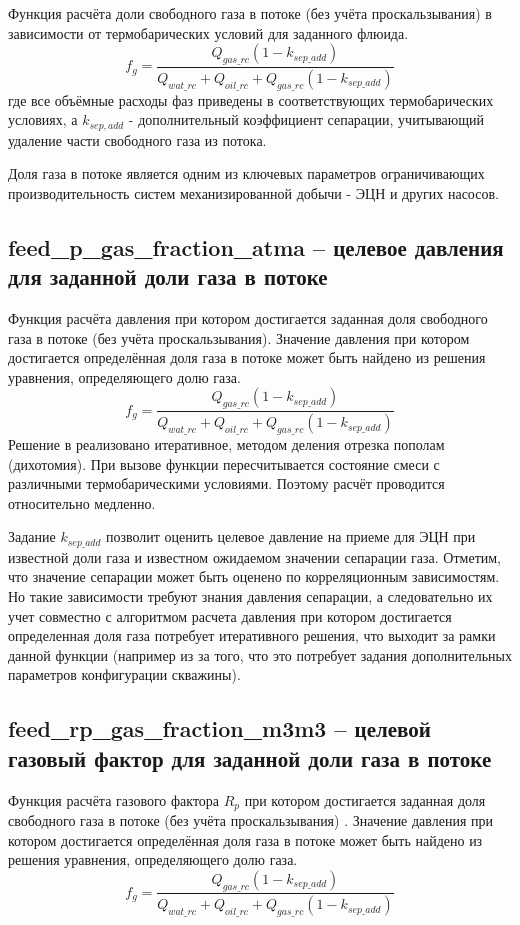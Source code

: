 Функция расчёта доли свободного газа в потоке (без учёта проскальзывания) в зависимости от термобарических условий для заданного флюида. 
$$f_g = \frac{Q_{gas\_rc} (1-k_{sep\_add})}{Q_{wat\_rc}+Q_{oil\_rc}+Q_{gas\_rc}(1-k_{sep\_add})} $$
где все объёмные расходы фаз приведены в соответствующих термобарических условиях, а $k_{sep,add}$ - дополнительный коэффициент сепарации, учитывающий удаление части свободного газа из потока.

Доля газа в потоке является одним из ключевых параметров ограничивающих производительность систем механизированной добычи - ЭЦН и других насосов.


\subsection{feed\_p\_gas\_fraction\_atma – целевое давления для заданной доли газа в потоке}
Функция расчёта давления при котором достигается заданная доля свободного газа в потоке (без учёта проскальзывания). 
Значение давления при котором достигается определённая доля газа в потоке может быть найдено из решения уравнения, определяющего долю газа. 
$$f_g = \frac{Q_{gas\_rc} (1-k_{sep\_add})}{Q_{wat\_rc}+Q_{oil\_rc}+Q_{gas\_rc}(1-k_{sep\_add})} $$
Решение в \unf{} реализовано итеративное, методом деления отрезка пополам (дихотомия). При вызове функции пересчитывается состояние смеси с различными термобарическими условиями. Поэтому расчёт проводится относительно медленно. 

Задание $k_{sep\_add}$ позволит оценить целевое давление на приеме для ЭЦН при известной доли газа и известном ожидаемом значении сепарации газа. Отметим, что значение сепарации может быть оценено по корреляционным зависимостям. Но такие зависимости требуют знания давления сепарации, а следовательно их учет совместно с алгоритмом расчета давления при котором достигается определенная доля газа потребует итеративного решения, что выходит за рамки данной функции (например из за того, что это потребует задания дополнительных параметров конфигурации скважины).




\subsection{feed\_rp\_gas\_fraction\_m3m3 – целевой газовый фактор для заданной доли газа в потоке}
Функция расчёта газового фактора $R_p$ при котором достигается заданная доля свободного газа в потоке (без учёта проскальзывания) . 
Значение давления при котором достигается определённая доля газа в потоке может быть найдено из решения уравнения, определяющего долю газа. 
$$f_g = \frac{Q_{gas\_rc} (1-k_{sep\_add})}{Q_{wat\_rc}+Q_{oil\_rc}+Q_{gas\_rc}(1-k_{sep\_add})} $$

